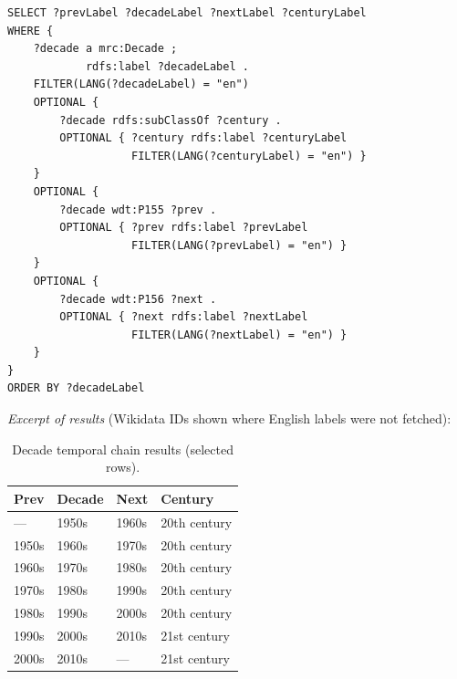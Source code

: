 \begin{footnotesize}
\begin{verbatim}
SELECT ?prevLabel ?decadeLabel ?nextLabel ?centuryLabel
WHERE {
    ?decade a mrc:Decade ;
            rdfs:label ?decadeLabel .
    FILTER(LANG(?decadeLabel) = "en")
    OPTIONAL {
        ?decade rdfs:subClassOf ?century .
        OPTIONAL { ?century rdfs:label ?centuryLabel
                   FILTER(LANG(?centuryLabel) = "en") }
    }
    OPTIONAL {
        ?decade wdt:P155 ?prev .
        OPTIONAL { ?prev rdfs:label ?prevLabel
                   FILTER(LANG(?prevLabel) = "en") }
    }
    OPTIONAL {
        ?decade wdt:P156 ?next .
        OPTIONAL { ?next rdfs:label ?nextLabel
                   FILTER(LANG(?nextLabel) = "en") }
    }
}
ORDER BY ?decadeLabel
\end{verbatim}
\end{footnotesize}

\noindent\textit{Excerpt of results} (Wikidata IDs shown where English labels were not fetched):

\begin{table}[H]
\centering\footnotesize
\caption{Decade temporal chain results (selected rows).}
\begin{tabular}{llll}
\toprule
Prev & Decade & Next & Century \\ \midrule
---         & 1950s & 1960s & 20th century \\
1950s       & 1960s & 1970s & 20th century \\
1960s       & 1970s & 1980s & 20th century \\
1970s       & 1980s & 1990s & 20th century \\
1980s       & 1990s & 2000s & 20th century \\
1990s       & 2000s & 2010s & 21st century \\
2000s       & 2010s & ---   & 21st century \\
\bottomrule
\end{tabular}
\end{table}